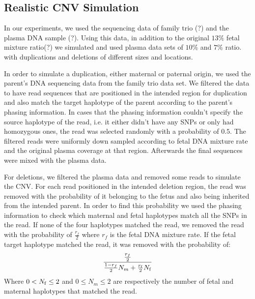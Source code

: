 \subsection{Realistic CNV Simulation}
	In our experiments, we used the sequencing data of family trio (?) and the plasma DNA sample (?). Using this data, in addition to the original $13\%$ fetal mixture ratio(?) we simulated and used plasma data sets of $10\%$ and $7\%$ ratio. with duplications and deletions of different sizes and locations.

	In order to simulate a duplication, either maternal or paternal origin, we used the parent's DNA sequencing data from the family trio data set. We filtered the data to have read sequences that are positioned in the intended region for duplication and also match the target haplotype of the parent according to the parent's phasing information.	In cases that the phasing information couldn't specify the source haplotype of the read, i.e. it either didn't have any SNPs or only had homozygous ones, the read was selected randomly with a probability of $0.5$. The filtered reads were uniformly down sampled according to fetal DNA mixture rate and the original plasma coverage at that region. Afterwards the final sequences were mixed with the plasma data.
	
	For deletions, we filtered the plasma data and removed some reads to simulate the CNV. For each read positioned in the intended deletion region, the read was removed with the probability of it belonging to the fetus and also being inherited from the intended parent. In order to find this probability we used the phasing information to check which maternal and fetal haplotypes match all the SNPs in the read. If none of the four haplotypes matched the read, we removed the read with the probability of $\frac{r_f}{2}$ where $r_f$ is the fetal DNA mixture rate. If the fetal target haplotype matched the read, it was removed with the probability of:
	$$\frac{ \frac{r_f}{2} } { \frac{1-r_f}{2} N_m + \frac{r_{\mathrm{f}}}{2} N_{\mathrm{f}}}$$
	Where $0 < N_{\mathrm{f}} \leq 2$ and $0 \leq N_m \leq 2$ are respectively the number of fetal and maternal haplotypes that matched the read.
	
